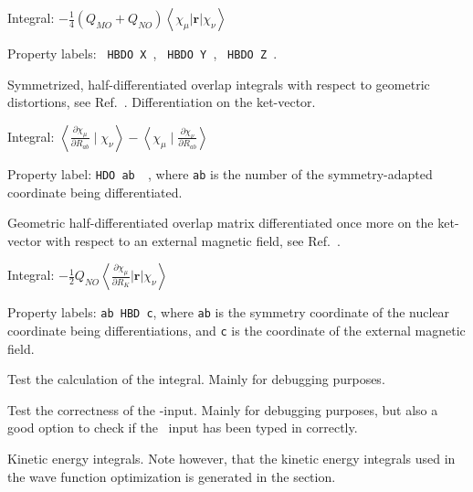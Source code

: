 \begin{description}
\begin{list}{}{}
\item Integral: $-\frac{1}{4}\left(Q_{MO} +
Q_{NO}\right)\left<\chi_{\mu}\left|{\mathbf r}\right|\chi_{\nu}\right>$
\item Property labels: \verb| HBDO X |, \verb| HBDO Y |, \verb| HBDO Z |.
\end{list}

\item[\Key{HDO}] Symmetrized, half-differentiated
overlap integrals with respect to geometric
distortions, see
Ref.~\cite{klbpjhjajjothjcp97}. Differentiation on the ket-vector.

\begin{list}{}{}
\item Integral: $\left<\frac{\partial \chi_{\mu}}{\partial
R_{ab}}\mid\chi_{\nu}\right> -
\left<\chi_{\mu}\mid\frac{\partial\chi_{\nu}}{\partial R_{ab}}\right>$
\item Property label: \verb|HDO ab  |, where \verb|ab| is the number
of the symmetry-adapted coordinate being differentiated.
\end{list}

\item[\Key{HDOBR}] Geometric half-differentiated overlap
matrix
differentiated once more on the ket-vector with respect to an external
magnetic field, see Ref.~\cite{klbpjthkrhjajjcp98}.

\begin{list}{}{}
\item Integral: $-\frac{1}{2}Q_{NO}\left<\frac{\partial
\chi_{\mu}}{\partial R_K}\left|{\mathbf r}\right|\chi_{\nu}\right>$
\item Property labels: \verb|ab HBD c|, where \verb|ab| is the
symmetry coordinate of the nuclear coordinate being differentiations,
and \verb|c| is the coordinate of the external magnetic field.
\end{list}

\item[\Key{HDOBRT}] Test the calculation of the 
integral. Mainly for debugging purposes.

\item[\Key{INPTES}] Test the correctness of the -input. Mainly
for debugging purposes, but also a good option to check if the \mol\ input
has been typed in correctly.

\item[\Key{KINENE}] Kinetic energy integrals. Note however, that the kinetic energy integrals used in the
wave function optimization is generated in the  section.


\end{description}

